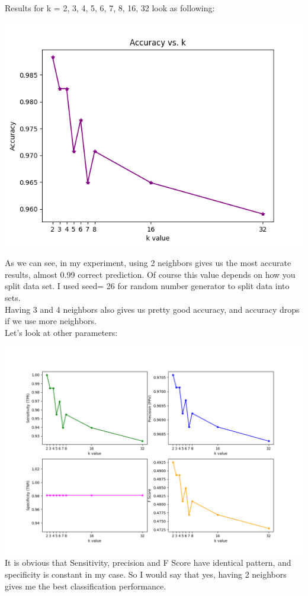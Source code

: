 \documentclass[12pt, letterpaper]{article}
\begin{document}
\begin{enumerate}[label=\Roman*.]
\begin{enumerate}[label=\arabic*.]
	Results for k = 2, 3, 4, 5, 6, 7, 8, 16, 32 look as following: \\
	\begin{center}
	 	\includegraphics[scale=0.7]{../images/accuracy.png} 
	\end{center}
	 As we can see, in my experiment, using 2 neighbors gives us the most accurate results, almost 0.99 correct prediction. Of course this value depends on how you split data set. I used seed= 26 for random number generator to split data into sets. \\
	 Having 3 and 4 neighbors also gives us pretty good accuracy, and accuracy drops if we use more neighbors. \\
	 
	 Let's look at other parameters: \\
	\end{enumerate}
	\includegraphics[scale=0.65]{../images/metrics.png} 
	It is obvious that Sensitivity, precision and F Score have identical pattern, and specificity is constant in my case. So I would say that yes, having 2 neighbors gives me the best classification performance. \\
	

\end{enumerate}
\end{document}
